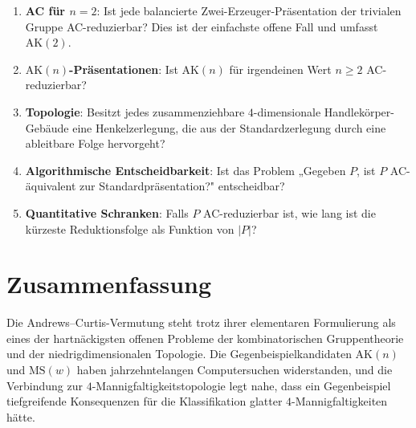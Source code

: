 \documentclass[12pt,a4paper]{amsart}
\theoremstyle{definition}
\theoremstyle{remark}
\begin{document}
\begin{enumerate}[label=(\arabic*)]
  \item \textbf{AC für $n = 2$}: Ist jede balancierte Zwei-Erzeuger-Präsentation
        der trivialen Gruppe AC-reduzierbar? Dies ist der einfachste offene Fall
        und umfasst $\mathrm{AK}(2)$.

  \item \textbf{$\mathrm{AK}(n)$-Präsentationen}: Ist $\mathrm{AK}(n)$ für
        irgendeinen Wert $n \geq 2$ AC-reduzierbar?

  \item \textbf{Topologie}: Besitzt jedes zusammenziehbare $4$-dimensionale
        Handlekörper-Gebäude eine Henkelzerlegung, die aus der Standardzerlegung
        durch eine ableitbare Folge hervorgeht?

  \item \textbf{Algorithmische Entscheidbarkeit}: Ist das Problem „Gegeben $P$,
        ist $P$ AC-äquivalent zur Standardpräsentation?" entscheidbar?

  \item \textbf{Quantitative Schranken}: Falls $P$ AC-reduzierbar ist, wie lang ist die
        kürzeste Reduktionsfolge als Funktion von $|P|$?
\end{enumerate}

\section{Zusammenfassung}

Die Andrews--Curtis-Vermutung steht trotz ihrer elementaren Formulierung als eines
der hartnäckigsten offenen Probleme der kombinatorischen Gruppentheorie und der
niedrigdimensionalen Topologie. Die Gegenbeispielkandidaten $\mathrm{AK}(n)$ und
$\mathrm{MS}(w)$ haben jahrzehntelangen Computersuchen widerstanden, und die Verbindung
zur $4$-Mannigfaltigkeitstopologie legt nahe, dass ein Gegenbeispiel tiefgreifende
Konsequenzen für die Klassifikation glatter $4$-Mannigfaltigkeiten hätte.
\end{document}
